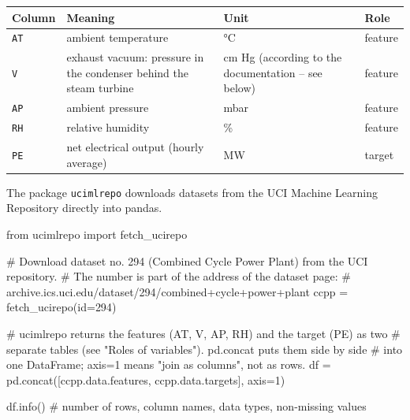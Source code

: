 \documentclass[
  letterpaper,
  DIV=11,
  numbers=noendperiod]{scrreprt}
\newenvironment{Shaded}{\begin{snugshade}}{\end{snugshade}}
\newcommand{\BuiltInTok}[1]{\textcolor[rgb]{0.00,0.23,0.31}{#1}}
\newcommand{\CommentTok}[1]{\textcolor[rgb]{0.37,0.37,0.37}{#1}}
\newcommand{\DecValTok}[1]{\textcolor[rgb]{0.68,0.00,0.00}{#1}}
\newcommand{\ImportTok}[1]{\textcolor[rgb]{0.00,0.46,0.62}{#1}}
\newcommand{\NormalTok}[1]{\textcolor[rgb]{0.00,0.23,0.31}{#1}}
\newcommand{\OperatorTok}[1]{\textcolor[rgb]{0.37,0.37,0.37}{#1}}
\begin{document}
\begin{longtable}[]{@{}
  >{\raggedright\arraybackslash}p{}
  >{\raggedright\arraybackslash}p{}
  >{\raggedright\arraybackslash}p{}
  >{\raggedright\arraybackslash}p{}@{}}
\toprule\noalign{}
\begin{minipage}[b]{\linewidth}\raggedright
Column
\end{minipage} & \begin{minipage}[b]{\linewidth}\raggedright
Meaning
\end{minipage} & \begin{minipage}[b]{\linewidth}\raggedright
Unit
\end{minipage} & \begin{minipage}[b]{\linewidth}\raggedright
Role
\end{minipage} \\
\midrule\noalign{}
\endhead
\bottomrule\noalign{}
\endlastfoot
\texttt{AT} & ambient temperature & °C & feature \\
\texttt{V} & exhaust vacuum: pressure in the condenser behind the steam
turbine & cm Hg (according to the documentation -- see below) &
feature \\
\texttt{AP} & ambient pressure & mbar & feature \\
\texttt{RH} & relative humidity & \% & feature \\
\texttt{PE} & net electrical output (hourly average) & MW & target \\
\end{longtable}

The package \texttt{ucimlrepo} downloads datasets from the UCI Machine
Learning Repository directly into pandas.

\begin{Shaded}
\begin{Highlighting}[]
\ImportTok{from}\NormalTok{ ucimlrepo }\ImportTok{import}\NormalTok{ fetch\_ucirepo}

\CommentTok{\# Download dataset no. 294 (Combined Cycle Power Plant) from the UCI repository.}
\CommentTok{\# The number is part of the address of the dataset page:}
\CommentTok{\# archive.ics.uci.edu/dataset/294/combined+cycle+power+plant}
\NormalTok{ccpp }\OperatorTok{=}\NormalTok{ fetch\_ucirepo(}\BuiltInTok{id}\OperatorTok{=}\DecValTok{294}\NormalTok{)}

\CommentTok{\# ucimlrepo returns the features (AT, V, AP, RH) and the target (PE) as two}
\CommentTok{\# separate tables (see "Roles of variables"). pd.concat puts them side by side}
\CommentTok{\# into one DataFrame; axis=1 means "join as columns", not as rows.}
\NormalTok{df }\OperatorTok{=}\NormalTok{ pd.concat([ccpp.data.features, ccpp.data.targets], axis}\OperatorTok{=}\DecValTok{1}\NormalTok{)}

\NormalTok{df.info()   }\CommentTok{\# number of rows, column names, data types, non{-}missing values}
\end{Highlighting}
\end{Shaded}
\end{document}
